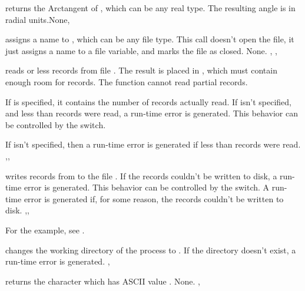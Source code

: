\documentclass{report}
\begin{document}


{ returns the Arctangent of , which can be any real type.
The resulting angle is in radial units.}{None}{, }



{ assigns a name to , which can be any file type.
This call doesn't open the file, it just assigns a name to a file variable,
and marks the file as closed.}
{None.}
{, , }



{ reads  or less records from file . The
result is placed in , which must contain enough room for
 records. The function cannot read partial records. 

If  is specified, it contains the number of records actually
read. If  isn't specified, and less than  records were
read, a run-time error is generated. This behavior can be controlled by the
 switch. }
{If  isn't specified, then a run-time error is generated if less
than  records were read.}
{,, }



{ writes  records from  to the file
 . 
If the records couldn't be written to disk, a run-time error is generated.
This behavior can be controlled by the  switch. 
}
{A run-time error is generated if, for some reason, the records couldn't be
written to disk.}
{,, }

For the example, see .

{ changes the working directory of the process to .}
{If the directory  doesn't exist, a run-time error is generated.}
{, }



{ returns the character which has ASCII value .}
{None.}
{,}
\end{document}
